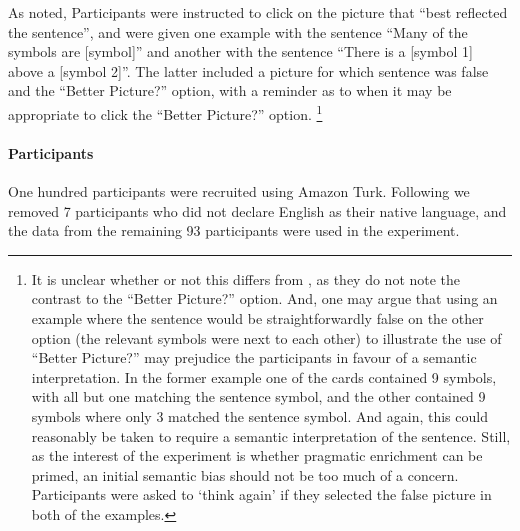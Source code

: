 \documentclass[10pt]{article}
\begin{document}
\begin{multicols}{2}
As noted, Participants were instructed to click on the picture that ``best reflected the sentence'', and were given one example with the sentence ``Many of the symbols are [symbol]'' and another with the sentence ``There is a [symbol 1] above a [symbol 2]''.
The latter included a picture for which sentence was false and the ``Better Picture?'' option, with a reminder as to when it may be appropriate to click the ``Better Picture?'' option.\nolinebreak
\footnote{It is unclear whether or not this differs from \citeauthor{Bott:2016aa}, as they do not note the contrast to the ``Better Picture?'' option.
  And, one may argue that using an example where the sentence would be straightforwardly false on the other option (the relevant symbols were next to each other) to illustrate the use of ``Better Picture?'' may prejudice the participants in favour of a semantic interpretation.
  In the former example one of the cards contained 9 symbols, with all but one matching the sentence symbol, and the other contained 9 symbols where only 3 matched the sentence symbol.
  And again, this could reasonably be taken to require a semantic interpretation of the sentence.
  Still, as the interest of the experiment is whether pragmatic enrichment can be primed, an initial semantic bias should not be too much of a concern.
  Participants were asked to `think again' if they selected the false picture in both of the examples.
}

\paragraph{Participants}

One hundred participants were recruited using Amazon Turk.
Following \citeauthor{Bott:2016aa} we removed 7 participants who did not declare English as their native language, and the data from the remaining 93 participants were used in the experiment.


\end{multicols}
\end{document}
